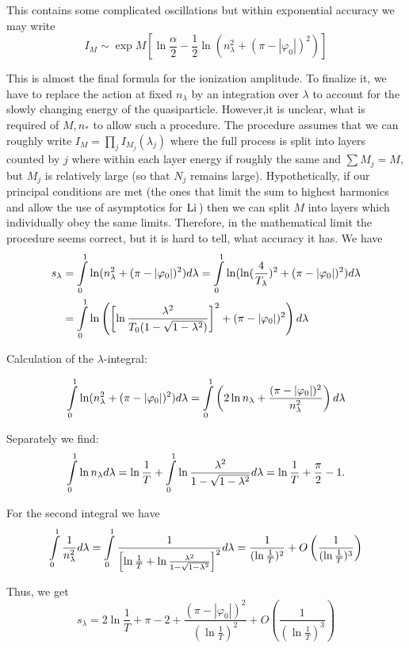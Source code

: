 This contains some complicated oscillations but within exponential
accuracy we may write
\[
I_{M}\sim\exp M\left[\ln\frac{\alpha}{2}-\frac{1}{2}\ln(n_{\lambda}^{2}+(\pi-|\varphi_{0}|)^{2})\right]
\]

This is almost the final formula for the ionization amplitude. To
finalize it, we have to replace the action at fixed $n_{\lambda}$
by an integration over $\lambda$ to account for the slowly changing
energy of the quasiparticle. However,it is unclear, what is required
of $M,n_{*}$ to allow such a procedure. The procedure assumes that
we can roughly write $I_{M}=\prod_{j}I_{M_{j}}(\lambda_{j})$ where
the full process is split into layers counted by $j$ where within
each layer energy if roughly the same and $\sum M_{j}=M$, but $M_{j}$
is relatively large (so that $N_{j}$ remains large). Hypothetically,
if our principal conditions are met (the ones that limit the sum to
highest harmonics and allow the use of asymptotics for $\mathrm{Li}\,$) then
we can split $M$ into layers which individually obey the same limits.
Therefore, in the mathematical limit the procedure seems correct,
but it is hard to tell, what accuracy it has. We have
\begin{align*}
s_{\lambda} & =\intop_{0}^{1}\ln(n_{\lambda}^{2}+(\pi-|\varphi_{0}|)^{2})d\lambda=\intop_{0}^{1}\ln(\ln(\frac{4}{T_{\lambda}})^{2}+(\pi-|\varphi_{0}|)^{2})d\lambda\\
& =\intop_{0}^{1}\ln\left(\left[\ln\frac{\lambda^{2}}{T_{0}(1-\sqrt{1-\lambda^{2}})}\right]^{2}+(\pi-|\varphi_{0}|)^{2}\right)d\lambda
\end{align*}

Calculation of the $\lambda$-integral:

\[
\intop_{0}^{1}\ln(n_{\lambda}^{2}+(\pi-|\varphi_{0}|)^{2})d\lambda=\intop_{0}^{1}\left(2\ln n_{\lambda}+\frac{(\pi-|\varphi_{0}|)^{2}}{n_{\lambda}^{2}}\right)d\lambda
\]

Separately we find:
\[
\intop_{0}^{1}\ln n_{\lambda}d\lambda=\ln\frac{1}{T}+\intop_{0}^{1}\ln\frac{\lambda^{2}}{1-\sqrt{1-\lambda^{2}}}d\lambda=\ln\frac{1}{T}+\frac{\pi}{2}-1.
\]

For the second integral we have
\[
\intop_{0}^{1}\frac{1}{n_{\lambda}^{2}}d\lambda=\intop_{0}^{1}\frac{1}{\left[\ln\frac{1}{T}+\ln\frac{\lambda^{2}}{1-\sqrt{1-\lambda^{2}}}\right]^{2}}d\lambda=\frac{1}{(\ln\frac{1}{T})^{2}}+O\left(\frac{1}{(\ln\frac{1}{T})^{3}}\right)
\]

Thus, we get 
\[
s_{\lambda}=2\ln\frac{1}{T}+\pi-2+\frac{(\pi-|\varphi_{0}|)^{2}}{(\ln\frac{1}{T})^{2}}+O\left(\frac{1}{(\ln\frac{1}{T})^{3}}\right)
\]

